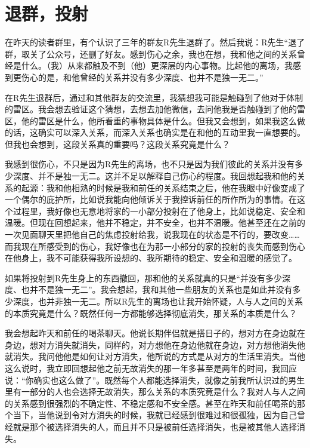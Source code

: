 \chapter{退群，投射}





在昨天的读者群里，有个认识了三年的群友R先生退群了。然后我说：R先生“退了群，取关了公众号，还删了好友。感到伤心之余，我也在想，我和他之间的关系曾经是什么。（我）从来都触及不到（他）更深层的内心事物。比起他的离场，我感到更伤心的是，和他曾经的关系并没有多少深度、也并不是独一无二。”

在R先生退群后，通过和其他群友的交流里，我猜想我可能是触碰到了他对于体制的雷区。我会想去验证这个猜想，去想去加他微信，去问他我是否触碰到了他的雷区，他的雷区是什么，他所看重的事物具体是什么。但我又会想到，如果我这么做的话，这确实可以深入关系，而深入关系也确实是在和他的互动里我一直想要的。但我也会想到，这段关系真的重要吗？这段关系究竟是什么？

我感到很伤心，不只是因为R先生的离场，也不只是因为我们彼此的关系并没有多少深度、并不是独一无二。这并不足以解释自己伤心的程度。我回想起我和他的关系的起源：我和他相熟的时候是我和前任的关系结束之后，他在我眼中好像变成了一个偶尔的庇护所，比如说我能向他倾诉关于我控诉前任的所作所为的事情。在这个过程里，我好像也无意地将家的一小部分投射在了他身上，比如说稳定、安全和温暖。但现在回想起来，他并不稳定，并不安全，也并不温暖。他甚至还在之前的一次见面聊天里把他自己的焦虑投射给我，说我现在的状态是不行的，要改变……而我现在所感受到的伤心，我好像也在为那一小部分的家的投射的丧失而感到伤心\pozhehao{}在他身上，我不可能获得我所设想的、我所期待的稳定、安全和温暖的感觉了。

如果将投射到R先生身上的东西撤回，那和他的关系就真的只是“并没有多少深度、也并不是独一无二”。我会想起，我和其他一些朋友的关系也是如此\pozhehao{}并没有多少深度，也并非独一无二。所以R先生的离场也让我开始怀疑，人与人之间的关系的本质究竟是什么？既然任何一方都能够选择彻底消失，那关系的本质是什么？

我会想起昨天和前任的喝茶聊天。他说长期伴侣就是搭日子的，想对方在身边就在身边，想对方消失就消失，同样的，对方想他在身边他就在身边，对方想他消失他就消失。我问他他是如何让对方消失，他所说的方式是从对方的生活里消失。当他这么说时，我立即回想起他之前无故消失的那一年多甚至是两年的时间，我回应说：“你确实也这么做了”。既然每个人都能选择消失，就像之前我所认识过的男生里有一部分的人也会选择无故消失，那么关系的本质究竟是什么？我对人与人之间的关系感到很强烈的不确定性、不稳定感和不安全感。甚至在昨天和前任喝茶的那个当下，当他说到令对方消失的时候，我就已经感到很难过和很孤独，因为自己曾经就是那个被选择消失的人，而且并不只是被前任选择消失，也是被其他人选择消失。

